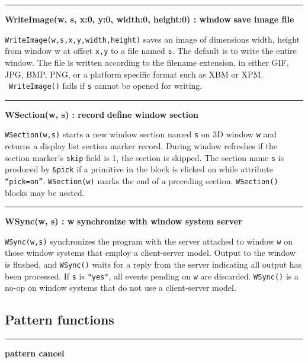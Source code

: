 \bigskip\hrule\vspace{0.1cm}
\noindent
{\bf WriteImage(w, s, x:0, y:0, width:0, height:0) : window } \hfill {\bf save image file}

\noindent
\texttt{WriteImage(w,s,x,y,width,height)} saves an image of dimensions
width, height from window w at offset \texttt{x,y} to a file named
\texttt{s}. The default is to write the entire window. The file
is written according to the filename extension, in either GIF, JPG,
BMP, PNG, or a platform specific format such as XBM or XPM.
\ \texttt{WriteImage()} fails if \texttt{s} cannot be opened for
writing.

\bigskip\hrule\vspace{0.1cm}
\noindent
{\bf WSection(w, s) : record} \hfill {\bf define window section}

\noindent
\texttt{WSection(w,s)} starts a new window section named \texttt{s} on
3D window \texttt{w} and returns a display list section marker record.
During window refreshes if the section marker's
\texttt{skip} field is 1, the section is skipped. The section name
\texttt{s} is produced by \texttt{\&pick} if a primitive in the block
is clicked on while attribute
\texttt{{\textquotedblleft}pick=on{\textquotedblright}}.
\texttt{WSection(w)} marks the end of a preceding section.
\texttt{WSection()} blocks may be nested.

\bigskip\hrule\vspace{0.1cm}
\noindent
{\bf WSync(w, s) : w} \hfill {\bf synchronize with window system server}

\noindent
\texttt{WSync(w,s)} synchronizes the program with the server attached to
window \texttt{w} on those window systems that employ a client-server
model. Output to the window is flushed, and \texttt{WSync()} waits
for a reply from the server indicating all output has been processed.
If \texttt{s} is \texttt{"yes"}, all
events pending on \texttt{w} are discarded. \texttt{WSync()} is a no-op
on window systems that do not use a client-server model.

\subsection*{Pattern functions}

\bigskip\hrule\vspace{0.1cm}
 \hfill{\bf pattern cancel}\\

